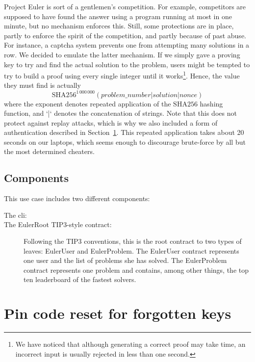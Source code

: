 \documentclass[10pt,a4paper]{article}
\begin{document}
Project Euler is sort of a gentlemen's competition. For example, competitors are supposed to have found the answer using a program running at most in one minute, but no mechanism enforces this. Still, some protections are in place, partly to enforce the spirit of the competition, and partly because of past abuse. For instance, a captcha system prevents one from attempting many solutions in a row. We decided to emulate the latter mechanism. If we simply gave a proving key to try and find the actual solution to the problem, users might be tempted to try to build a proof using every single integer until it works\footnote{We have noticed that although generating a correct proof may take time, an incorrect input is usually rejected in less than one second.}. Hence, the value they must find is actually
\[ \textrm{SHA256}^{1\,000\,000}\left(problem\_number | solution | nonce\right)\]
where the exponent denotes repeated application of the $\textrm{SHA256}$ hashing function, and `|` denotes the concatenation of strings. Note that this does not protect against replay attacks, which is why we also included a form of authentication described in Section~\ref{section_pincode}. This repeated application takes about 20 seconds on our laptops, which seems enough to discourage brute-force by all but the most determined cheaters.


\subsection{Components}
\label{subsec:euler_components}


This use case includes two different components:

\begin{description}
	\item[The cli:]
	\item[The EulerRoot TIP3-style contract:] Following the TIP3 conventions, this is the root contract to two types of leaves: EulerUser and EulerProblem. The EulerUser contract represents one user and the list of problems she has solved. The EulerProblem contract represents one problem and contains, among other things, the top ten leaderboard of the fastest solvers.
\end{description}

\section{Pin code reset for forgotten keys}
\label{section_pincode}
\end{document}
